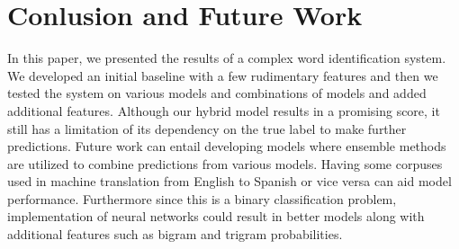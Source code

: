 \documentclass[10pt,a4paper]{article}
\begin{document}
\section{Conlusion and Future Work}
In this paper, we presented the results of a complex word identification system. We developed an initial baseline with a few rudimentary features and then we tested the system on various models and combinations of models and added additional features. Although our hybrid model results in a promising score, it still has a limitation of its dependency on the true label to make further predictions. Future work can entail developing models where ensemble methods are utilized to combine predictions from various models. Having some corpuses used in machine translation from English to Spanish or vice versa can aid model performance. Furthermore since this is a binary classification problem, implementation of neural networks could result in better models along with additional features such as bigram and trigram probabilities.










































%
%


\end{document}
